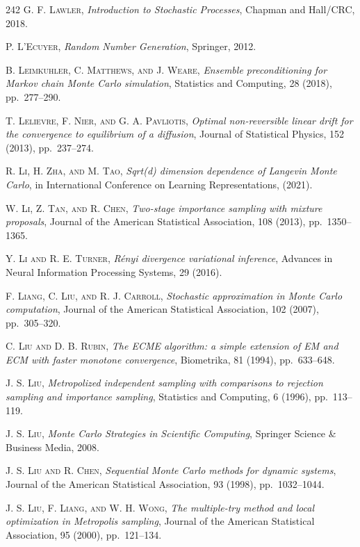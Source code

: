 \begin{thebibliography}{242}
\textsc{G. F. Lawler},
\textit{Introduction to Stochastic Processes},
Chapman and Hall/CRC, 2018.

\textsc{P. L'Ecuyer},
\textit{Random Number Generation},
Springer, 2012.

\textsc{B. Leimkuhler, C. Matthews, and J. Weare},
\textit{Ensemble preconditioning for Markov chain Monte Carlo simulation},
Statistics and Computing, 28 (2018), pp.\ 277--290.

\textsc{T. Lelievre, F. Nier, and G. A. Pavliotis},
\textit{Optimal non-reversible linear drift for the convergence to equilibrium of a diffusion},
Journal of Statistical Physics, 152 (2013), pp.\ 237--274.

\textsc{R. Li, H. Zha, and M. Tao},
\textit{Sqrt(d) dimension dependence of Langevin Monte Carlo},
in International Conference on Learning Representations, (2021).

\textsc{W. Li, Z. Tan, and R. Chen},
\textit{Two-stage importance sampling with mixture proposals},
Journal of the American Statistical Association, 108 (2013), pp.\ 1350--1365.

\textsc{Y. Li and R. E. Turner},
\textit{R\'enyi divergence variational inference},
Advances in Neural Information Processing Systems, 29 (2016).

\textsc{F. Liang, C. Liu, and R. J. Carroll},
\textit{Stochastic approximation in Monte Carlo computation},
Journal of the American Statistical Association, 102 (2007), pp.\ 305--320.

\textsc{C. Liu and D. B. Rubin},
\textit{The ECME algorithm: a simple extension of EM and ECM with faster monotone convergence},
Biometrika, 81 (1994), pp.\ 633--648.

\textsc{J. S. Liu},
\textit{Metropolized independent sampling with comparisons to rejection sampling and importance sampling},
Statistics and Computing, 6 (1996), pp.\ 113--119.

\textsc{J. S. Liu},
\textit{Monte Carlo Strategies in Scientific Computing},
Springer Science \& Business Media, 2008.

\textsc{J. S. Liu and R. Chen},
\textit{Sequential Monte Carlo methods for dynamic systems},
Journal of the American Statistical Association, 93 (1998), pp.\ 1032--1044.

\textsc{J. S. Liu, F. Liang, and W. H. Wong},
\textit{The multiple-try method and local optimization in Metropolis sampling},
Journal of the American Statistical Association, 95 (2000), pp.\ 121--134.


\end{thebibliography}
